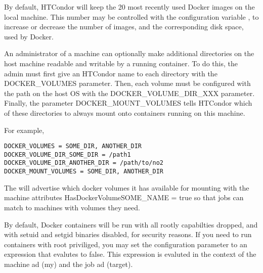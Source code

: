By default, HTCondor will keep the 20 most recently used Docker images
on the local machine.  This number may be controlled with the configuration
variable , 
to increase or decrease the number
of images, and the corresponding disk space, used by Docker.

An administrator of a machine can optionally make additional directories
on the host machine readable and writable by a running container.
To do this, the admin must first give an HTCondor name to each directory
with the DOCKER\_VOLUMES parameter.  Then, each volume must be configured
with the path on the host OS with the DOCKER\_VOLUME\_DIR\_XXX parameter.
Finally, the parameter DOCKER\_MOUNT\_VOLUMES tells HTCondor which of
these directories to always mount onto containers running on this machine.

For example,
\begin{verbatim}
DOCKER_VOLUMES = SOME_DIR, ANOTHER_DIR
DOCKER_VOLUME_DIR_SOME_DIR = /path1
DOCKER_VOLUME_DIR_ANOTHER_DIR = /path/to/no2
DOCKER_MOUNT_VOLUMES = SOME_DIR, ANOTHER_DIR
\end{verbatim}

The  will advertise which docker volumes it has available 
for mounting with the machine attributes HasDockerVolumeSOME\_NAME = true
so that jobs can match to machines with volumes they need.

By default, Docker containers will be run with all rootly capabilties dropped,
and with setuid and setgid binaries disabled, for security reasons. If  you
need to run containers with root priviliged, you may set the configuration
parameter  to an expression that
evalutes to false.  This expression is evaluted in the context of the machine ad (my) and the job ad (target).

